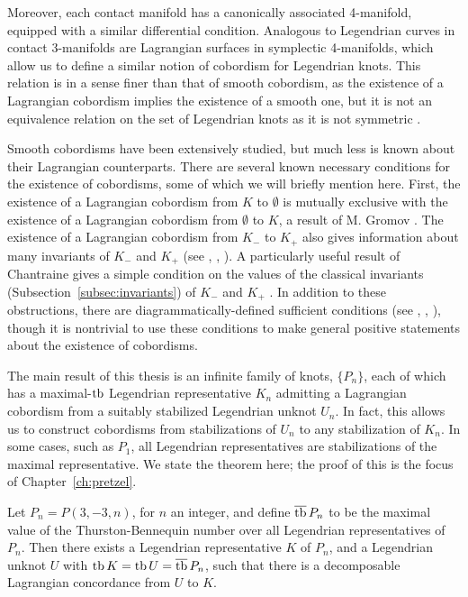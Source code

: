 Moreover, each contact manifold has a canonically associated 4-manifold, equipped with a similar differential condition. Analogous to Legendrian curves in contact 3-manifolds are Lagrangian surfaces in symplectic 4-manifolds, which allow us to define a similar notion of cobordism for Legendrian knots.
This relation is in a sense finer than that of smooth cobordism, as the existence of a Lagrangian cobordism implies the existence of a smooth one, but it is not an equivalence relation on the set of Legendrian knots as it is not symmetric \cite{chantraine2015}.

Smooth cobordisms have been extensively studied, but much less is known about their Lagrangian counterparts. There are several known necessary conditions for the existence of cobordisms, some of which we will briefly mention here.
First, the existence of a Lagrangian cobordism from $K$ to $\emptyset$ is mutually exclusive with the existence of a Lagrangian cobordism from $\emptyset$ to $K$, a result of M. Gromov \cite{gromov}.
The existence of a Lagrangian cobordism from $K_-$ to $K_+$ also gives information about many invariants of $K_-$ and $K_+$ (see \cite{pan}, \cite{cdrg}, \cite{baldwin}). 
A particularly useful result of Chantraine gives a simple condition on the values of the classical invariants (Subsection~\ref{subsec:invariants}) of $K_-$ and $K_+$ \cite{chantraine2010}.
In addition to these obstructions, there are diagrammatically-defined sufficient conditions (see \cite{bourgeois15}, \cite{lin}, \cite{guadagni}), though it is nontrivial to use these conditions to make general positive statements about the existence of cobordisms.

The main result of this thesis is an infinite family of knots, $\{P_n\}$, each of which has a maximal-$\operatorname{tb}$ Legendrian representative $K_n$ admitting a Lagrangian cobordism from a suitably stabilized Legendrian unknot $U_n$. In fact, this allows us to construct cobordisms from stabilizations of $U_n$ to any stabilization of $K_n$. In some cases, such as $P_1$, all Legendrian representatives are stabilizations of the maximal representative.
We state the theorem here; the proof of this is the focus of Chapter~\ref{ch:pretzel}.

\begin{mythmcopy}
     Let $P_n = P(3, -3, n)$, for $n$ an integer, and define $\overline{\operatorname{tb}}\, P_n$ to be the maximal value of the Thurston-Bennequin number over all Legendrian representatives of $P_n$. Then there exists a Legendrian representative $K$ of $P_n$, and a Legendrian unknot $U$ with $\operatorname{tb} K = \operatorname{tb} U = \overline{\operatorname{tb}}\, P_n$, such that there is a decomposable Lagrangian concordance from $U$ to $K$.
\end{mythmcopy}



